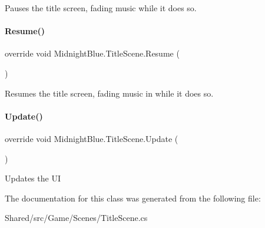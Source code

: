 Pauses the title screen, fading music while it does so. 

\hypertarget{class_midnight_blue_1_1_title_scene_afb0bb3ad8b2766b5d57537dc1ef22249}{}\label{class_midnight_blue_1_1_title_scene_afb0bb3ad8b2766b5d57537dc1ef22249} 
\paragraph{\texorpdfstring{Resume()}{Resume()}}
{\footnotesize\ttfamily override void Midnight\+Blue.\+Title\+Scene.\+Resume (\begin{DoxyParamCaption}{ }\end{DoxyParamCaption})\hspace{0.3cm}{\ttfamily [inline]}}



Resumes the title screen, fading music in while it does so. 

\hypertarget{class_midnight_blue_1_1_title_scene_a4052b2a261434462cd0150e2f4da3c5b}{}\label{class_midnight_blue_1_1_title_scene_a4052b2a261434462cd0150e2f4da3c5b} 
\paragraph{\texorpdfstring{Update()}{Update()}}
{\footnotesize\ttfamily override void Midnight\+Blue.\+Title\+Scene.\+Update (\begin{DoxyParamCaption}{ }\end{DoxyParamCaption})\hspace{0.3cm}{\ttfamily [inline]}}



Updates the UI 



The documentation for this class was generated from the following file\+:\begin{DoxyCompactItemize}
\item 
Shared/src/\+Game/\+Scenes/Title\+Scene.\+cs\end{DoxyCompactItemize}
